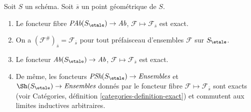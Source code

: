\begin{lemma}
\label{lemma-stalk-exact}
Soit $S$ un sch\'ema. Soit $\overline{s}$ un point g\'eom\'etrique de $S$.
\begin{enumerate}
\item Le foncteur fibre
$\textit{PAb}(S_\etale) \to \textit{Ab}$,
$\mathcal{F}  \mapsto  \mathcal{F}_{\overline{s}}$
est exact.
\item On a $(\mathcal{F}^\#)_{\overline{s}} = \mathcal{F}_{\overline{s}}$
pour tout pr\'efaisceau d'ensembles $\mathcal{F}$ sur $S_\etale$.
\item Le foncteur
$\textit{Ab}(S_\etale) \to \textit{Ab}$,
$\mathcal{F} \mapsto \mathcal{F}_{\overline{s}}$ est exact.
\item De m\^eme, les foncteurs
$\textit{PSh}(S_\etale) \to \textit{Ensembles}$ et
$\Sh(S_\etale) \to \textit{Ensembles}$ donn\'es par le foncteur fibre
$\mathcal{F} \mapsto \mathcal{F}_{\overline{s}}$ sont exacts (voir
Catégories, définition \ref{categories-definition-exact})
et commutent aux limites inductives arbitraires.
\end{enumerate}
\end{lemma}

